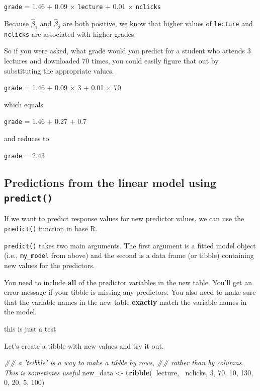 \documentclass[]{book}
\newenvironment{Shaded}{\begin{snugshade}}{\end{snugshade}}
\newcommand{\CommentTok}[1]{\textcolor[rgb]{0.56,0.35,0.01}{\textit{#1}}}
\newcommand{\DecValTok}[1]{\textcolor[rgb]{0.00,0.00,0.81}{#1}}
\newcommand{\KeywordTok}[1]{\textcolor[rgb]{0.13,0.29,0.53}{\textbf{#1}}}
\newcommand{\NormalTok}[1]{#1}
\newcommand{\OperatorTok}[1]{\textcolor[rgb]{0.81,0.36,0.00}{\textbf{#1}}}
\newcommand{\StringTok}[1]{\textcolor[rgb]{0.31,0.60,0.02}{#1}}
\begin{document}
\texttt{grade} = 1.46 + 0.09 \(\times\) \texttt{lecture} + 0.01 \(\times\) \texttt{nclicks}

Because \(\hat{\beta}_1\) and \(\hat{\beta}_2\) are both positive, we know that higher values of \texttt{lecture} and \texttt{nclicks} are associated with higher grades.

So if you were asked, what grade would you predict for a student who attends 3 lectures and downloaded 70 times, you could easily figure that out by substituting the appropriate values.

\texttt{grade} = 1.46 + 0.09 \(\times\) 3 + 0.01 \(\times\) 70

which equals

\texttt{grade} = 1.46 + 0.27 + 0.7

and reduces to

\texttt{grade} = 2.43

\hypertarget{predictions-from-the-linear-model-using-predict}{%
\subsection{\texorpdfstring{Predictions from the linear model using \texttt{predict()}}{Predictions from the linear model using predict()}}\label{predictions-from-the-linear-model-using-predict}}

If we want to predict response values for new predictor values, we can use the \texttt{predict()} function in base R.

\texttt{predict()} takes two main arguments. The first argument is a fitted model object (i.e., \texttt{my\_model} from above) and the second is a data frame (or tibble) containing new values for the predictors.

\begin{warning}
You need to include \textbf{all} of the predictor variables in the new
table. You'll get an error message if your tibble is missing any
predictors. You also need to make sure that the variable names in the
new table \textbf{exactly} match the variable names in the model.
\end{warning}

\begin{watchout}
this is just a test
\end{watchout}

Let's create a tibble with new values and try it out.

\begin{Shaded}
\begin{Highlighting}[]
\CommentTok{## a 'tribble' is a way to make a tibble by rows,}
\CommentTok{## rather than by columns. This is sometimes useful}
\NormalTok{new_data <-}\StringTok{ }\KeywordTok{tribble}\NormalTok{(}\OperatorTok{~}\NormalTok{lecture, }\OperatorTok{~}\NormalTok{nclicks,}
                    \DecValTok{3}\NormalTok{, }\DecValTok{70}\NormalTok{,}
                    \DecValTok{10}\NormalTok{, }\DecValTok{130}\NormalTok{,}
                    \DecValTok{0}\NormalTok{, }\DecValTok{20}\NormalTok{,}
                    \DecValTok{5}\NormalTok{, }\DecValTok{100}\NormalTok{)}
\end{Highlighting}
\end{Shaded}
\end{document}
